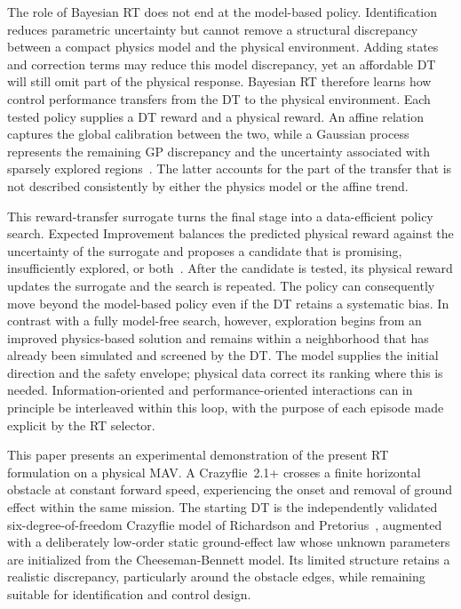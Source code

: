 \documentclass[journal]{IEEEtran}
\begin{document}
The role of Bayesian RT does not end at the model-based policy. Identification reduces parametric uncertainty but cannot remove a structural discrepancy between a compact physics model and the physical environment. Adding states and correction terms may reduce this model discrepancy, yet an affordable DT will still omit part of the physical response. Bayesian RT therefore learns how control performance transfers from the DT to the physical environment. Each tested policy supplies a DT reward and a physical reward. An affine relation captures the global calibration between the two, while a Gaussian process represents the remaining GP discrepancy and the uncertainty associated with sparsely explored regions~\cite{Kennedy2001,Rasmussen2006}. The latter accounts for the part of the transfer that is not described consistently by either the physics model or the affine trend.

This reward-transfer surrogate turns the final stage into a data-efficient policy search. Expected Improvement balances the predicted physical reward against the uncertainty of the surrogate and proposes a candidate that is promising, insufficiently explored, or both~\cite{Mockus1975,Forrester2007}. After the candidate is tested, its physical reward updates the surrogate and the search is repeated. The policy can consequently move beyond the model-based policy even if the DT retains a systematic bias. In contrast with a fully model-free search, however, exploration begins from an improved physics-based solution and remains within a neighborhood that has already been simulated and screened by the DT. The model supplies the initial direction and the safety envelope; physical data correct its ranking where this is needed. Information-oriented and performance-oriented interactions can in principle be interleaved within this loop, with the purpose of each episode made explicit by the RT selector.

This paper presents an experimental demonstration of the present RT formulation on a physical MAV. A Crazyflie~2.1+ crosses a finite horizontal obstacle at constant forward speed, experiencing the onset and removal of ground effect within the same mission. The starting DT is the independently validated six-degree-of-freedom Crazyflie model of Richardson and Pretorius~\cite{Richardson2025}, augmented with a deliberately low-order static ground-effect law whose unknown parameters are initialized from the Cheeseman-Bennett model. Its limited structure retains a realistic discrepancy, particularly around the obstacle edges, while remaining suitable for identification and control design.
\end{document}

